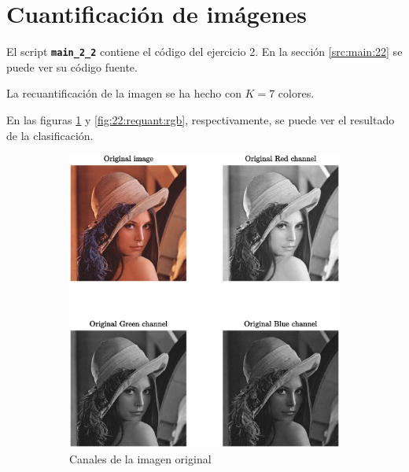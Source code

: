 \documentclass[11pt]{article} %
\begin{document}
\clearpage

\section{Cuantificación de imágenes}

El script \textbf{\texttt{main\_2\_2}} contiene el código del ejercicio 2. En la
sección \ref{src:main:22} se puede ver su código fuente.

La recuantificación de la imagen se ha hecho con $K=7$ colores.

En las figuras \ref{fig:22:original:rgb} y \ref{fig:22:requant:rgb},
respectivamente, se puede ver el resultado de la clasificación.

\begin{figure}[h]
    \centering
    \begin{subfigure}[b]{0.435\textwidth}
        \includegraphics[width=\textwidth]{../src/fig/22_original_lena.eps}
        \caption[]{Canales de la imagen original}
        \label{fig:22:original:rgb}
    \end{subfigure}
    \quad
    \begin{subfigure}[b]{0.435\textwidth}

\end{subfigure}
\end{figure}
\end{document}
